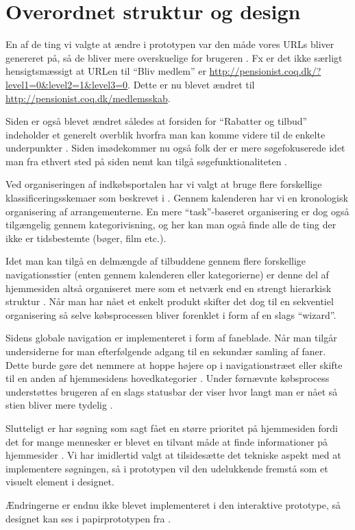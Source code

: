 \chapter{Overordnet struktur og design}

En af de ting vi valgte at ændre i prototypen var den måde vores URLs
bliver genereret på, så de bliver mere overskuelige for brugeren \cite[s.
385]{Benyon2010}. Fx er det ikke særligt hensigtsmæssigt at URLen til ``Bliv
medlem'' er \url{http://pensionist.coq.dk/?level1=0&level2=1&level3=0}. Dette
er nu blevet ændret til \url{http://pensionist.coq.dk/medlemsskab}.

Siden er også blevet ændret således at forsiden for ``Rabatter og tilbud''
indeholder et generelt overblik hvorfra man kan komme videre til de enkelte
underpunkter \cite[s. 386]{Benyon2010}. Siden imødekommer nu også folk der
er mere søgefokuserede idet man fra ethvert sted på siden nemt kan tilgå
søgefunktionaliteten \cite[s. 386]{Benyon2010}.

Ved organiseringen af indkøbsportalen har vi valgt at bruge flere forskellige
klassificeringsskemaer som beskrevet i \cite[s. 392--394]{Benyon2010}.
Gennem kalenderen har vi en kronologisk organisering af arrangementerne.
En mere ``task''-baseret organisering er dog også tilgængelig gennem
kategorivisning, og her kan man også finde alle de ting der ikke er
tidsbestemte (bøger, film etc.).

Idet man kan tilgå en delmængde af tilbuddene gennem flere forskellige
navigationsstier (enten gennem kalenderen eller kategorierne) er denne del af
hjemmesiden altså organiseret mere som et netværk end en strengt hierarkisk
struktur \cite[s. 396]{Benyon2010}. Når man har nået et enkelt produkt
skifter det dog til en sekventiel organisering så selve købsprocessen bliver
forenklet i form af en slags ``wizard''.

Sidens globale navigation er implementeret i form af faneblade. Når
man tilgår undersiderne for man efterfølgende adgang til en sekundær
samling af faner. Dette burde gøre det nemmere at hoppe højere op i
navigationstræet eller skifte til en anden af hjemmesidens hovedkategorier
\cite[s. 402]{Benyon2010}. Under førnævnte købsprocess understøttes
brugeren af en slags statusbar der viser hvor langt man er nået så stien
bliver mere tydelig \cite[s. 403]{Benyon2010}.

Slutteligt er har søgning som sagt fået en større prioritet på
hjemmesiden fordi det for mange mennesker er blevet en tilvant måde at finde
informationer på hjemmesider \cite[s. 405]{Benyon2010}. Vi har imidlertid
valgt at tilsidesætte det tekniske aspekt med at implementere søgningen, så
i prototypen vil den udelukkende fremstå som et visuelt element i designet.

Ændringerne er endnu ikke blevet implementeret i den interaktive prototype,
så designet kan ses i papirprototypen fra \cite{osos}.
